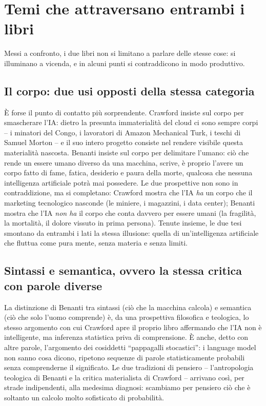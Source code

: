 \documentclass[a4paper,11pt]{article}
\begin{document}
\section{Temi che attraversano entrambi i libri}

Messi a confronto, i due libri non si limitano a parlare delle stesse cose: si illuminano a vicenda, e in alcuni punti si contraddicono in modo produttivo.

\subsection{Il corpo: due usi opposti della stessa categoria}

È forse il punto di contatto più sorprendente. Crawford insiste sul corpo per smascherare l'IA: dietro la presunta immaterialità del cloud ci sono sempre corpi -- i minatori del Congo, i lavoratori di Amazon Mechanical Turk, i teschi di Samuel Morton -- e il suo intero progetto consiste nel rendere visibile questa materialità nascosta. Benanti insiste sul corpo per delimitare l'umano: ciò che rende un essere umano diverso da una macchina, scrive, è proprio l'avere un corpo fatto di fame, fatica, desiderio e paura della morte, qualcosa che nessuna intelligenza artificiale potrà mai possedere. Le due prospettive non sono in contraddizione, ma si completano: Crawford mostra che l'IA \emph{ha} un corpo che il marketing tecnologico nasconde (le miniere, i magazzini, i data center); Benanti mostra che l'IA \emph{non ha} il corpo che conta davvero per essere umani (la fragilità, la mortalità, il dolore vissuto in prima persona). Tenute insieme, le due tesi smontano da entrambi i lati la stessa illusione: quella di un'intelligenza artificiale che fluttua come pura mente, senza materia e senza limiti.

\subsection{Sintassi e semantica, ovvero la stessa critica con parole diverse}

La distinzione di Benanti tra sintassi (ciò che la macchina calcola) e semantica (ciò che solo l'uomo comprende) è, da una prospettiva filosofica e teologica, lo stesso argomento con cui Crawford apre il proprio libro affermando che l'IA non è intelligente, ma inferenza statistica priva di comprensione. È anche, detto con altre parole, l'argomento dei cosiddetti ``pappagalli stocastici'': i language model non sanno cosa dicono, ripetono sequenze di parole statisticamente probabili senza comprenderne il significato. Le due tradizioni di pensiero -- l'antropologia teologica di Benanti e la critica materialista di Crawford -- arrivano così, per strade indipendenti, alla medesima diagnosi: scambiamo per pensiero ciò che è soltanto un calcolo molto sofisticato di probabilità.
\end{document}
